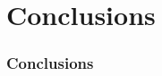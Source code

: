 \documentclass{beamer}
\begin{document}
\section{Conclusions}

  \frame
  {
    \frametitle{Conclusions}

    \centerline{}
  }
\end{document}
